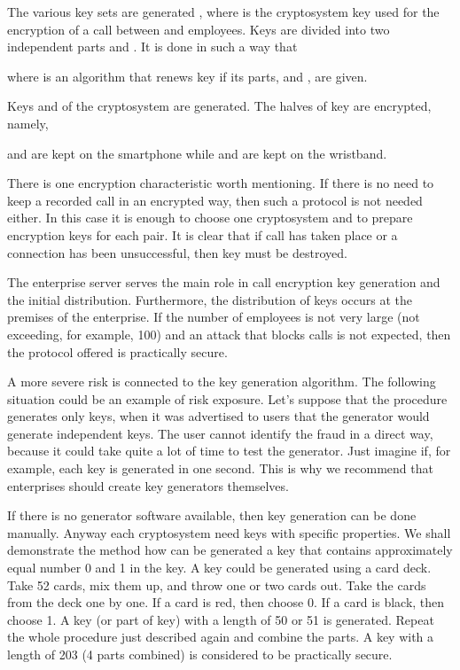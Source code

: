 \documentclass{bjmc}
\begin{document}
 The  various key sets are generated , 
where  is the cryptosystem
 key used for the encryption of a call  between  and  employees. Keys  are divided into two independent parts  and .
 It is done in such a way that  

 where  is an algorithm that renews key  if its parts,  and , are given.

Keys  and  of the cryptosystem  are generated. The halves of key  are encrypted, namely,

 and   are kept on the smartphone while  and   are kept on the wristband.

There is one encryption characteristic worth mentioning. If there is no need to keep a recorded call in an encrypted way, then such a protocol is not needed either. In this case it is enough
 to choose one cryptosystem  and to prepare  encryption keys   for each  pair. It is clear that if  call  has taken place or a connection has been 
unsuccessful, then key  must be destroyed.

The enterprise server serves the main role in call encryption key generation and the initial distribution. Furthermore, the distribution of keys occurs at the premises of the enterprise. 
If the number 
of employees  is not very large (not exceeding, for example, 100) and an attack that blocks calls is not expected, then the protocol offered is practically secure.

A more severe risk is connected to the key generation algorithm. The following situation could be an example of risk exposure. Let's suppose that the procedure generates only 
 keys, when it was advertised to users that the generator would generate  independent keys. The user cannot identify the fraud in a direct way, because it could take 
quite a lot of time to test the generator. Just imagine if, for example, each key is generated in one second. This is why we recommend that enterprises should create key generators themselves.

If there is no generator software available, then key generation can be done
manually.
 Anyway each cryptosystem need keys with specific
properties. We shall demonstrate the method how can be generated a key that contains approximately equal number 0 and 1 in the key.
 A key could be generated using a card deck. Take 52 cards, mix them up, and
throw one or two cards out. Take the cards from the deck one by one. If a card is red, then choose 0.
If a card is black, then choose 1.
A key (or part of key) with a length of 50 or 51 is generated. Repeat the whole procedure just described again and combine the parts. A key with a length of 203 
(4 parts combined) is considered to be practically secure.
\end{document}
